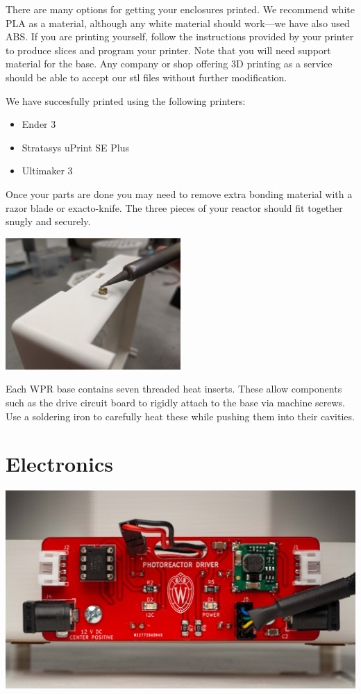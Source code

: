 \documentclass[11pt]{article}
\let\stdsection\section
\renewcommand\section{\clearpage\stdsection}
\begin{document}
There are many options for getting your enclosures printed.
We recommend white PLA as a material, although any white material should work---we have also used ABS.
If you are printing yourself, follow the instructions provided by your printer to produce slices and program your printer.
Note that you will need support material for the base.
Any company or shop offering 3D printing as a service should be able to accept our stl files without further modification.

We have succesfully printed using the following printers:

\begin{itemize}
  \item Ender 3
  \item Stratasys uPrint SE Plus
  \item Ultimaker 3
\end{itemize}

Once your parts are done you may need to remove extra bonding material with a razor blade or exacto-knife.
The three pieces of your reactor should fit together snugly and securely.

\clearpage

\begin{center}
  \includegraphics[width=0.5\textwidth]{"./heat-insert.jpg"}
\end{center}

Each WPR base contains seven threaded heat inserts.
These allow components such as the drive circuit board to rigidly attach to the base via machine screws.
Use a soldering iron to carefully heat these while pushing them into their cavities.

\section{Electronics} \label{SEC:electronics}

\includegraphics[width=\textwidth]{"./electronics-coverart.jpg"}
\end{document}
